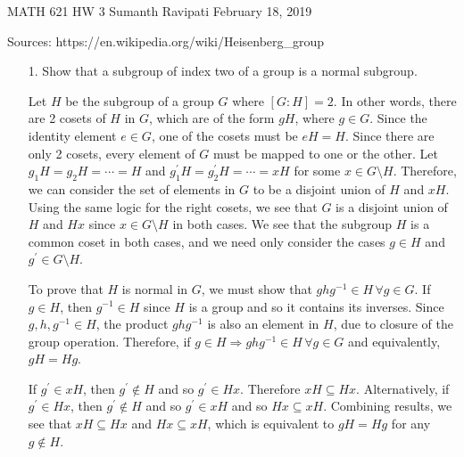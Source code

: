 \documentclass[12pt,letterpaper,reqno]{amsart}
\begin{document}
\thispagestyle{empty}
\begin{center}\large{
    MATH 621\quad
    HW 3\quad
    Sumanth Ravipati\quad
    February 18, 2019}
\end{center}
\vspace{.15in}
\begin{flushleft}
Sources: https://en.wikipedia.org/wiki/Heisenberg\_group
\end{flushleft}
\vspace{.25in}

\begin{enumerate}
\item[1.] Show that a subgroup of index two of a group is a normal subgroup.
\newline

\begin{flushleft}
Let $H$ be the subgroup of a group $G$ where $[G:H] = 2$. In other words, there are 2 cosets of $H$ in $G$, which are of the form $gH$, where $g \in G$. Since the identity element $e \in G$, one of the cosets must be $eH = H$. Since there are only 2 cosets, every element of $G$ must be mapped to one or the other. Let $g_1H = g_2H = \cdots = H$ and $g_1^\prime H = g_2^\prime H = \cdots = xH$ for some $x \in G\setminus H$. Therefore, we can consider the set of elements in $G$ to be a disjoint union of $H$ and $xH$. Using the same logic for the right cosets, we see that $G$ is a disjoint union of $H$ and $Hx$ since $x \in G\setminus H$ in both cases. We see that the subgroup $H$ is a common coset in both cases, and we need only consider the cases $g \in H$ and $g^\prime \in G\setminus H$. 
\newline

To prove that $H$ is normal in $G$, we must show that $ghg^{-1} \in H\, \forall g \in G$. If $g \in H$, then $g^{-1} \in H$ since $H$ is a group and so it contains its inverses. Since $g, h, g^{-1} \in H$, the product $ghg^{-1}$ is also an element in $H$, due to closure of the group operation. Therefore, if $g \in H \Rightarrow ghg^{-1} \in H\, \forall g \in G$ and equivalently, $gH = Hg$.
\newline

If $g^\prime \in xH$, then $g^\prime \not\in H$ and so $g^\prime \in Hx$. Therefore $xH \subseteq Hx$. Alternatively, if $g^\prime \in Hx$, then $g^\prime \not\in H$ and so $g^\prime \in xH$ and so $Hx \subseteq xH$. Combining results, we see that $xH \subseteq Hx$ and $Hx \subseteq xH$, which is equivalent to $gH = Hg$ for any $g \not\in H$.
\newline


\end{flushleft}
\end{enumerate}
\end{document}
